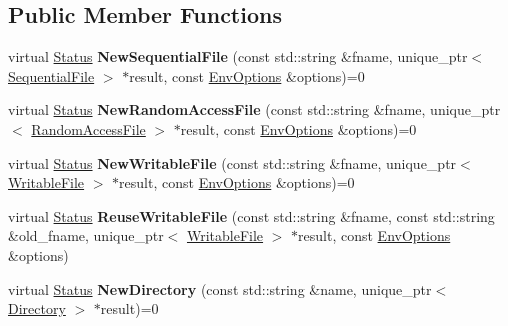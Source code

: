 \subsection*{Public Member Functions}
\begin{DoxyCompactItemize}
\item 
virtual \hyperlink{classrocksdb_1_1Status}{Status} {\bfseries New\+Sequential\+File} (const std\+::string \&fname, unique\+\_\+ptr$<$ \hyperlink{classrocksdb_1_1SequentialFile}{Sequential\+File} $>$ $\ast$result, const \hyperlink{structrocksdb_1_1EnvOptions}{Env\+Options} \&options)=0\hypertarget{classrocksdb_1_1Env_af2eb6650bd551549c4f6f66ce0e51de3}{}\label{classrocksdb_1_1Env_af2eb6650bd551549c4f6f66ce0e51de3}

\item 
virtual \hyperlink{classrocksdb_1_1Status}{Status} {\bfseries New\+Random\+Access\+File} (const std\+::string \&fname, unique\+\_\+ptr$<$ \hyperlink{classrocksdb_1_1RandomAccessFile}{Random\+Access\+File} $>$ $\ast$result, const \hyperlink{structrocksdb_1_1EnvOptions}{Env\+Options} \&options)=0\hypertarget{classrocksdb_1_1Env_a6e6619074ecb6b5ba4e4a23ffb2e4974}{}\label{classrocksdb_1_1Env_a6e6619074ecb6b5ba4e4a23ffb2e4974}

\item 
virtual \hyperlink{classrocksdb_1_1Status}{Status} {\bfseries New\+Writable\+File} (const std\+::string \&fname, unique\+\_\+ptr$<$ \hyperlink{classrocksdb_1_1WritableFile}{Writable\+File} $>$ $\ast$result, const \hyperlink{structrocksdb_1_1EnvOptions}{Env\+Options} \&options)=0\hypertarget{classrocksdb_1_1Env_a2415186e0a399d70edabef9f477e4c47}{}\label{classrocksdb_1_1Env_a2415186e0a399d70edabef9f477e4c47}

\item 
virtual \hyperlink{classrocksdb_1_1Status}{Status} {\bfseries Reuse\+Writable\+File} (const std\+::string \&fname, const std\+::string \&old\+\_\+fname, unique\+\_\+ptr$<$ \hyperlink{classrocksdb_1_1WritableFile}{Writable\+File} $>$ $\ast$result, const \hyperlink{structrocksdb_1_1EnvOptions}{Env\+Options} \&options)\hypertarget{classrocksdb_1_1Env_abdb061a41cfd7f6d5ac57beb95f5aabc}{}\label{classrocksdb_1_1Env_abdb061a41cfd7f6d5ac57beb95f5aabc}

\item 
virtual \hyperlink{classrocksdb_1_1Status}{Status} {\bfseries New\+Directory} (const std\+::string \&name, unique\+\_\+ptr$<$ \hyperlink{classrocksdb_1_1Directory}{Directory} $>$ $\ast$result)=0\hypertarget{classrocksdb_1_1Env_a6fc64f5876b0755c7df72f38d148343f}{}\label{classrocksdb_1_1Env_a6fc64f5876b0755c7df72f38d148343f}


\end{DoxyCompactItemize}
